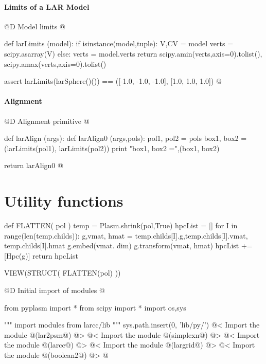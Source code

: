 \documentclass[11pt,oneside]{article}	%
\begin{document}
\paragraph{Limits of a LAR Model}
@D Model limits
@{def larLimits (model):
	if isinstance(model,tuple): 
		V,CV = model
		verts = scipy.asarray(V)
	else: verts = model.verts
	return scipy.amin(verts,axis=0).tolist(), scipy.amax(verts,axis=0).tolist()
	
assert larLimits(larSphere()()) == ([-1.0, -1.0, -1.0], [1.0, 1.0, 1.0])
@}

\paragraph{Alignment}
@D Alignment primitive
@{def larAlign (args):
	def larAlign0 (args,pols):
		pol1, pol2 = pols
		box1, box2 = (larLimits(pol1), larLimits(pol2))
		print "box1, box2 =",(box1, box2)
		
	return larAlign0
@}

\appendix
\section{Utility functions}



def FLATTEN( pol )
	temp = Plasm.shrink(pol,True)
	hpcList = []
	for I in range(len(temp.childs)):			
		g,vmat, hmat = temp.childs[I].g,temp.childs[I].vmat, temp.childs[I].hmat
		g.embed(vmat. dim)
		g.transform(vmat, hmat)
		hpcList += [Hpc(g)]
	return hpcList
	
VIEW(STRUCT( FLATTEN(pol) ))


@D Initial import of modules
@{from pyplasm import *
from scipy import *
import os,sys

""" import modules from larcc/lib """
sys.path.insert(0, 'lib/py/')
@< Import the module @(lar2psm@) @>
@< Import the module @(simplexn@) @>
@< Import the module @(larcc@) @>
@< Import the module @(largrid@) @>
@< Import the module @(boolean2@) @>
@}
\end{document}

